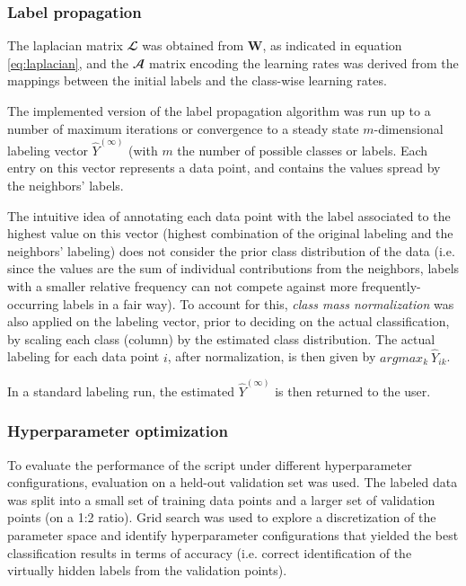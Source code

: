 \documentclass[oneside, a4paper, draft]{memoir} %
\begin{document}
\subsubsection{Label propagation}
The laplacian matrix $\mathbfcal{L}$ was obtained from $\mathbf W$, as indicated in equation \ref{eq:laplacian}, and
the $\mathbfcal A$ matrix encoding the learning rates was derived from the mappings between the initial labels
and the class-wise learning rates.

The implemented version of the label propagation algorithm was run up to a number of maximum iterations or
convergence to a steady state $m$-dimensional labeling vector $\hat{Y}^{(\infty)}$ (with $m$ the number of possible
classes or labels. Each entry on this vector represents a data point, and contains the values spread by the
neighbors' labels.

The intuitive idea of annotating each data point with the label associated to the highest
value on this vector (highest combination of the original labeling and the neighbors' labeling) does not consider
the prior class distribution of the data (i.e. since the values are the sum of individual contributions from 
the neighbors, labels with a smaller relative frequency can not compete against more frequently-occurring labels
in a fair way). To account for this, \emph{class mass normalization}\cite{zhu2003semi} was also applied on the
labeling vector, prior to deciding on the actual classification, by scaling each class (column) by the estimated
class distribution. The actual labeling for each data point $i$, after normalization, is then given
by $argmax_k\ \hat{Y}_{ik}$.

In a standard labeling run, the estimated $\hat{Y}^{(\infty)}$ is then returned to the user.

\subsubsection{Hyperparameter optimization}
To evaluate the performance of the script under different hyperparameter configurations, evaluation on a held-out
validation set was used. The labeled data was split into a small set of training data points and a larger set
of validation points (on a 1:2 ratio). Grid search was used to explore a discretization of the parameter space and
identify hyperparameter configurations that yielded the best classification results in terms of accuracy (i.e. correct 
identification of the virtually hidden labels from the validation points).
\end{document}

